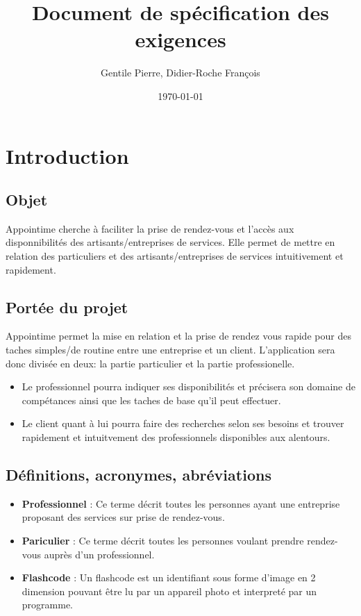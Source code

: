 \documentclass{article}
\author{Gentile Pierre, Didier-Roche François}
\date{\today}
\title{Document de spécification des exigences}
\begin{document}
\maketitle

\newpage
\tableofcontents
\newpage


\section{Introduction}
\subsection{Objet}
Appointime cherche à faciliter la prise de rendez-vous et l’accès aux disponnibilités des artisants/entreprises de services.
Elle permet de mettre en relation des particuliers et des artisants/entreprises de services intuitivement et rapidement.
\subsection{Portée du projet}
Appointime permet la mise en relation et la prise de rendez vous rapide pour des taches simples/de routine entre une entreprise et un client.
L’application sera donc divisée en deux: la partie particulier et la partie professionelle.
\begin{itemize}
\item Le professionnel pourra indiquer ses disponibilités et précisera son domaine de compétances ainsi que les taches de base qu’il peut effectuer.
\item Le client quant à lui pourra faire des recherches selon ses
  besoins et trouver rapidement et intuitvement des professionnels
  disponibles aux alentours.
\end{itemize}
\subsection{Définitions, acronymes, abréviations}
\begin{itemize}
\item \textbf{Professionnel} : Ce terme décrit toutes les personnes ayant une entreprise proposant des
  services sur prise de rendez-vous.
\item \textbf{Pariculier} : Ce terme décrit toutes les personnes
  voulant prendre rendez-vous auprès d'un professionnel.
\item \textbf{Flashcode} : Un flashcode est un identifiant sous forme
  d'image en 2 dimension pouvant être lu par un appareil photo et
  interpreté par un programme.

\end{itemize}
\end{document}
